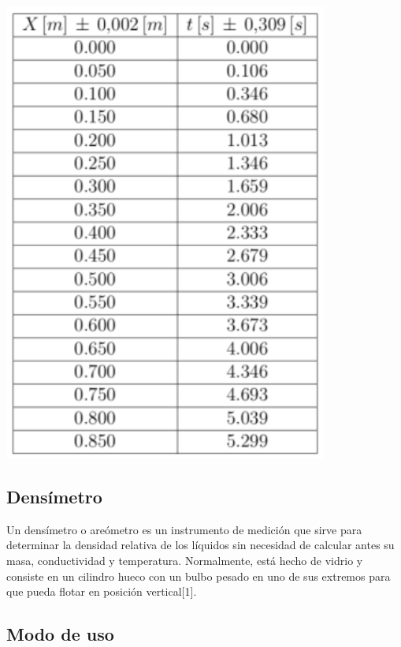 \documentclass[DIV=calc, paper=a4, fontsize=11pt]{scrartcl}
\newenvironment{Figura}
  {\par\medskip\noindent\minipage{\linewidth}}
  {\endminipage\par\medskip}
\begin{document}
\begin{multicols}{2}
\begin{Figura}
\centering
    \includegraphics[width=0.8\textwidth]{tablas/tabla 10 viscosidad.PNG}
    \label{fig}
\end{Figura}

\end{multicols}



\subsection*{Densímetro}

Un densímetro o areómetro es un instrumento de medición que sirve para determinar la densidad relativa de los líquidos sin necesidad de calcular antes su masa, conductividad y temperatura. Normalmente, está hecho de vidrio y consiste en un cilindro hueco con un bulbo pesado en uno de sus extremos para que pueda flotar en posición vertical[1].

\subsection*{Modo de uso}
\end{document}
